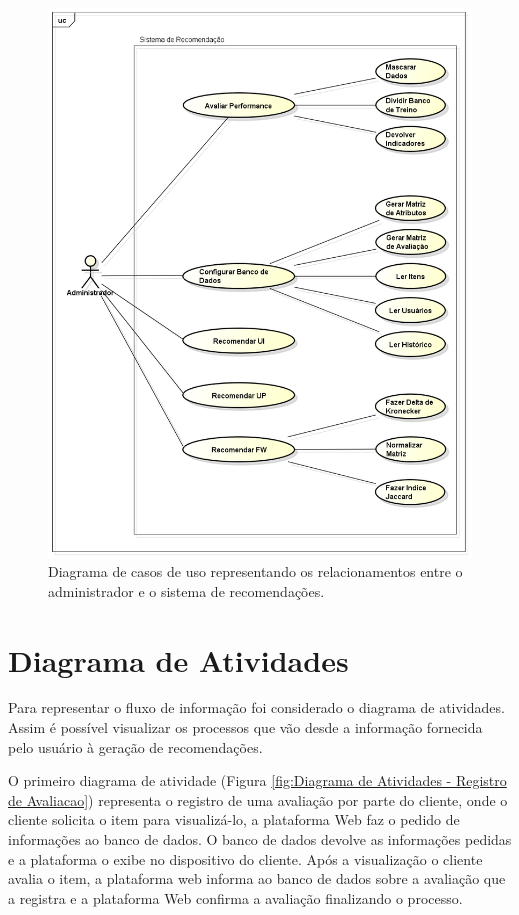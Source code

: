  \begin{figure}[htp]
    \begin{center}
    \includegraphics[width=1\textwidth]{img/CasosDeUso}
    \end{center}
    \label{fig:Diagrama de Casos de Uso}
    \caption{Diagrama de casos de uso representando os relacionamentos entre o administrador e o sistema de recomendações.}
\end{figure}

\section{Diagrama de Atividades} %
\label{sec:Diagrama de Atividades}

Para representar o fluxo de informação foi considerado o diagrama de atividades. Assim é possível visualizar os processos que vão desde a informação fornecida pelo usuário à geração de recomendações.

O primeiro diagrama de atividade (Figura \ref{fig:Diagrama de Atividades - Registro de Avaliacao}) representa o registro de uma avaliação por parte do cliente, onde o cliente solicita o item para visualizá-lo, a plataforma Web faz o pedido de informações ao banco de dados. O banco de dados devolve as informações pedidas e a plataforma o exibe no dispositivo do cliente. Após a visualização o cliente avalia o item, a plataforma web informa ao banco de dados sobre a avaliação que a registra e a plataforma Web confirma a avaliação finalizando o processo.

